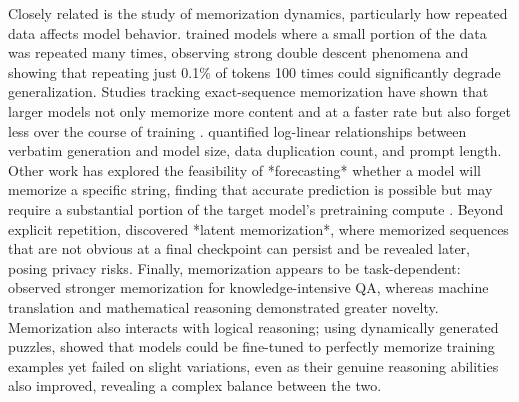 Closely related is the study of memorization dynamics, particularly how repeated data affects model behavior. \citet{hernandez2022scalinglawsinterpretabilitylearning} trained models where a small portion of the data was repeated many times, observing strong double descent phenomena \citep{advani2020high,belkin2019reconciling,adlam2020understanding,bordelon2020spectrum,schaeffer2024double} and showing that repeating just 0.1\% of tokens 100 times could significantly degrade generalization. Studies tracking exact-sequence memorization have shown that larger models not only memorize more content and at a faster rate but also forget less over the course of training \citep{tirumala2022memorization}. \citet{carlini2023quantifying} quantified log-linear relationships between verbatim generation and model size, data duplication count, and prompt length. Other work has explored the feasibility of *forecasting* whether a model will memorize a specific string, finding that accurate prediction is possible but may require a substantial portion of the target model's pretraining compute \citep{biderman2023emergent}. Beyond explicit repetition, \citet{duan2025uncovering} discovered *latent memorization*, where memorized sequences that are not obvious at a final checkpoint can persist and be revealed later, posing privacy risks. Finally, memorization appears to be task-dependent: \citet{wang2025generalization} observed stronger memorization for knowledge-intensive QA, whereas machine translation and mathematical reasoning demonstrated greater novelty. Memorization also interacts with logical reasoning; using dynamically generated puzzles, \citet{xie2025memorizationlargelanguagemodels} showed that models could be fine-tuned to perfectly memorize training examples yet failed on slight variations, even as their genuine reasoning abilities also improved, revealing a complex balance between the two.

